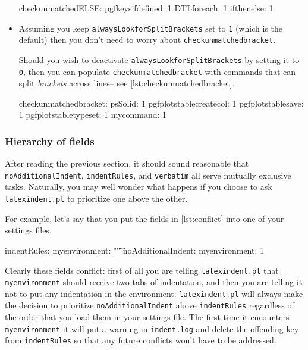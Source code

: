 \begin{itemize}
	\begin{yaml}[caption={\lstinline!checkunmatchedELSE!},label={lst:checkunmatchedELSE}]
checkunmatchedELSE:
    pgfkeysifdefined: 1
    DTLforeach: 1
    ifthenelse: 1
	\end{yaml}
	\item[\color{red}\verbitem{checkunmatchedbracket}] Assuming you keep \lstinline!alwaysLookforSplitBrackets! 
	set to \lstinline!1! (which is the default) then you don't need to worry about \lstinline!checkunmatchedbracket!. 
												 		 		 		 		 					
	Should you wish to deactivate \lstinline!alwaysLookforSplitBrackets! by setting it 
	to \lstinline!0!, then you can populate \lstinline!checkunmatchedbracket! with commands that can 
	split \emph{brackets} across lines-- see \cref{lst:checkunmatchedbracket}.
												 		 		 		 		 					
	\begin{yaml}[caption={\lstinline!checkunmatchedbracket!},label={lst:checkunmatchedbracket}]
checkunmatchedbracket:
    psSolid: 1
    pgfplotstablecreatecol: 1
    pgfplotstablesave: 1
    pgfplotstabletypeset: 1
    mycommand: 1
	\end{yaml}
\end{itemize}
 	 	 	 	 	
\subsubsection{Hierarchy of fields}\label{sec:fieldhierachy}
After reading the previous section, it should sound reasonable that 
\lstinline!noAdditionalIndent!, \lstinline!indentRules!, and 
\lstinline!verbatim! all serve mutually exclusive tasks. Naturally, you may 
well wonder what happens if you choose to ask \lstinline!latexindent.pl! to 
prioritize one above the other.
 	 	 	 	 	
For example, let's say that you put the fields in \cref{lst:conflict} into 
one of your settings files.  
\begin{yaml}[caption={Conflicting ideas},label={lst:conflict}]
indentRules:
   myenvironment: "\t\t"
noAdditionalIndent:
   myenvironment: 1
\end{yaml}
 	 	 	 	 	
Clearly these fields conflict: first of all 
you are telling \lstinline!latexindent.pl! that \lstinline!myenvironment! should 
receive two tabs of indentation, and then you are telling it 
not to put any indentation in the environment. \lstinline!latexindent.pl!
will always make the decision to prioritize \lstinline!noAdditionalIndent! above
\lstinline!indentRules! regardless of the order that you load them in 
your settings file. The first 
time it encounters \lstinline!myenvironment! it will put a warning in \lstinline!indent.log!
and delete the offending key from \lstinline!indentRules! so that any future 
conflicts won't have to be addressed.
 	 	 	 	 	
